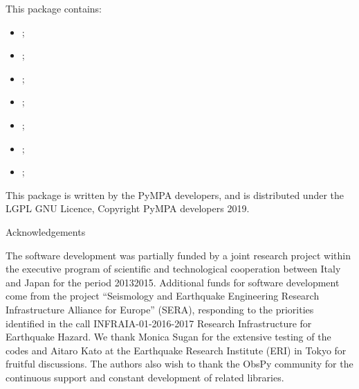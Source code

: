 \documentclass[a4paper,12pt,english]{sphinxmanual}
\begin{document}
This package contains:
\begin{itemize}
\item {} 
{\hyperref[\detokenize{sub/input.download_data::doc}]{}};

\item {} 
{\hyperref[\detokenize{sub/input.create_templates::doc}]{}};

\item {} 
{\hyperref[\detokenize{sub/input.calculate_ttimes::doc}]{}};

\item {} 
{\hyperref[\detokenize{sub/input.template_check::doc}]{}};

\item {} 
{\hyperref[\detokenize{sub/main.pympa::doc}]{}};

\item {} 
{\hyperref[\detokenize{sub/output.process_detections::doc}]{}};

\item {} 
{\hyperref[\detokenize{sub/output.verify_detection::doc}]{}};

\end{itemize}

This package is written by the PyMPA developers, and is distributed under the LGPL GNU Licence, Copyright PyMPA developers 2019.

Acknowledgements

The software development was partially funded by a joint research project within the
executive program of scientific and technological cooperation between Italy
and Japan for the period 2013\textendash{}2015. Additional funds for software development
come from the project “Seismology and Earthquake Engineering
Research Infrastructure Alliance for Europe” (SERA), responding to the priorities
identified in the call INFRAIA-01-2016-2017 Research Infrastructure
for Earthquake Hazard. We thank Monica Sugan for the extensive testing of the codes and Aitaro Kato
at the Earthquake Research Institute (ERI) in Tokyo for fruitful
discussions.
The authors also wish to thank the ObsPy community for the continuous
support and constant development of related libraries.
\end{document}
